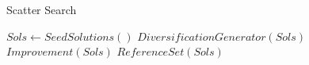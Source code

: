 \begin{algorithm}
  \caption{Scatter Search} \label{alg:SSInitial}
  \begin{algorithmic}
    \State $Sols \gets SeedSolutions()$
    \Repeat
    \State $DiversificationGenerator(Sols)$
    \State $Improvement(Sols)$
    \State $ReferenceSet(Sols)$
    \EndProcedure
  \end{algorithmic}
\end{algorithm}
